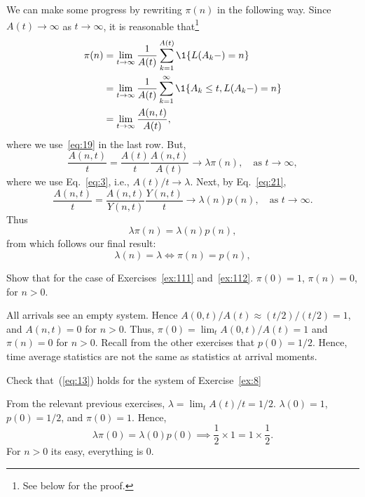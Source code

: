 We can make some progress by rewriting $\pi(n)$ in
the following way. Since $A(t)\to \infty$ as $t\to\infty$, it is reasonable 
that\footnote{See below for the proof.}
\begin{equation}\label{eq:132}
  \begin{split}
  \pi(n) &= \lim_{t\to\infty} \frac1{A(t)}\sum_{k=1}^{A(t)} \1{L(A_k-) = n} \\
  &= \lim_{t\to\infty} \frac1{A(t)}\sum_{k=1}^\infty \1{A_k \leq t, L(A_k-) = n} \\
  &= \lim_{t\to\infty} \frac{A(n,t)}{A(t)},
  \end{split}
\end{equation}
where we use~\eqref{eq:19} in the last row. But, 
\begin{equation}\label{eq:1333}
 \frac{A(n,t)}{t} 
= \frac{A(t)}t \frac{A(n,t)}{A(t)}
\to \lambda  \pi(n), \quad\text{as } t \to \infty, 
\end{equation}
where we use Eq.~\eqref{eq:3}, i.e., $A(t)/t \to \lambda$. 
Next, by  Eq.~\eqref{eq:21}, 
\begin{equation*}
\frac{A(n,t)}t = \frac{A(n,t)}{Y(n,t)}\frac{Y(n,t)}t \to \lambda(n) p(n), \quad\text{as } t \to \infty.
\end{equation*}
Thus
\begin{equation}\label{eq:13}
\lambda  \pi(n) = \lambda(n) p(n), 
\end{equation}
from which  follows our final result:
\begin{equation*}
  \lambda(n) = \lambda \iff \pi(n) = p(n), 
\end{equation*}

\begin{exercise}\label{ex:8} Show that for the case of Exercises~\ref{ex:111} and~\ref{ex:112}.  
$\pi(0)=1$, $\pi(n)=0$, for $n>0$.

\begin{solution}
  All arrivals see an empty system. Hence $A(0,t)/A(t) \approx (t/2)/(t/2) = 1$, and $A(n,t)=0$ for $n>0$. Thus, $\pi(0) = \lim_t A(0,t)/A(t) = 1$ and $\pi(n)=0$ for $n>0$. Recall from the other exercises that $p(0)=1/2$. Hence, time average statistics are not the same as statistics at arrival moments. 
\end{solution}

\end{exercise}

\begin{exercise}
  Check that~(\ref{eq:13})  holds for the system of Exercise~\ref{ex:8}
  \begin{solution}
From the relevant previous exercises, $\lambda = \lim_t A(t)/t = 1/2$. $\lambda(0)=1$, $p(0)=1/2$, and $\pi(0)=1$. Hence,
\begin{equation*}
  \lambda \pi(0) = \lambda(0) p(0) \implies  \frac 1 2 \times 1 = 1\times \frac 1 2.
\end{equation*}
For $n>0$ its easy, everything is 0.
  \end{solution}
\end{exercise}


